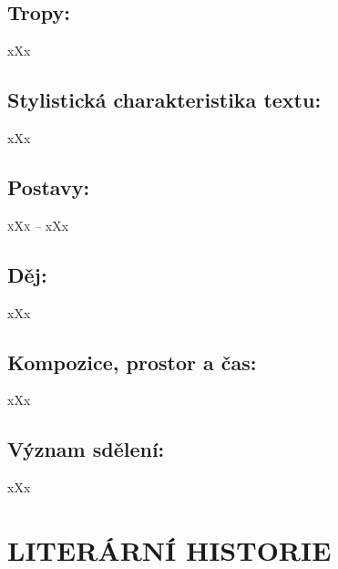 \documentclass{extarticle} %
\begin{document}
\subsection*{Tropy:}
\noindent 
xXx

\subsection*{Stylistická charakteristika textu:}
\noindent 
xXx

\subsection*{Postavy:}
\noindent 
\textsc{xXx --} xXx \\

\subsection*{Děj:}
\noindent 
xXx

\subsection*{Kompozice, prostor a čas:}
\noindent 
xXx

\subsection*{Význam sdělení:}
\noindent 
xXx

\section*{LITERÁRNÍ HISTORIE}




\end{document}
